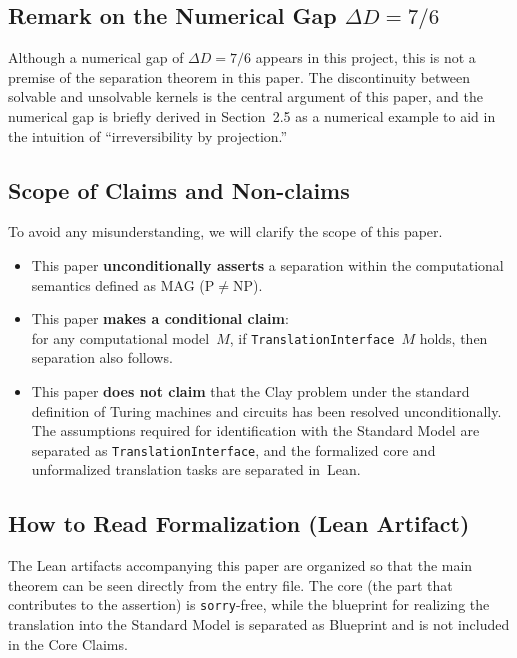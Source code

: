 \documentclass[11pt,a4paper]{article}
\theoremstyle{plain}
\theoremstyle{definition}
\newcommand{\TranslationInterface}{\texttt{TranslationInterface}}
\newcommand{\lean}[1]{\texttt{#1}}
\begin{document}
\subsection{Remark on the Numerical Gap $\Delta D = 7/6$}

Although a numerical gap of $\Delta D = 7/6$ appears in this project, this is not a premise of the separation theorem in this paper. The discontinuity between solvable and unsolvable kernels is the central argument of this paper, and the numerical gap is briefly derived in Section~2.5 as a numerical example to aid in the intuition of ``irreversibility by projection.''

\subsection{Scope of Claims and Non-claims}

To avoid any misunderstanding, we will clarify the scope of this paper.
\begin{itemize}[nosep]
\item This paper \textbf{unconditionally asserts} a separation within the computational semantics defined as MAG ($\mathrm{P} \neq \mathrm{NP}$).
\item This paper \textbf{makes a conditional claim}:\\
for any computational model~$M$, if \TranslationInterface{}~$M$ holds, then separation also follows.
\item This paper \textbf{does not claim} that the Clay problem under the standard definition of Turing machines and circuits has been resolved unconditionally. The assumptions required for identification with the Standard Model are separated as \TranslationInterface{}, and the formalized core and unformalized translation tasks are separated in~Lean.
\end{itemize}

\subsection{How to Read Formalization (Lean Artifact)}

The Lean artifacts accompanying this paper are organized so that the main theorem can be seen directly from the entry file. The core (the part that contributes to the assertion) is \lean{sorry}-free, while the blueprint for realizing the translation into the Standard Model is separated as Blueprint and is not included in the Core Claims.
\end{document}
